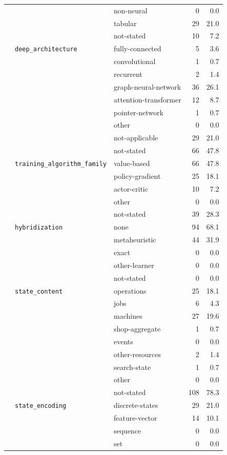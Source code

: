 \begin{longtable}{lllr@{\hspace{1.0em}}r}
 &  & non-neural & 0 & 0.0 \\
 &  & tabular & 29 & 21.0 \\
 &  & not-stated & 10 & 7.2 \\
 & \texttt{deep\_architecture} & fully-connected & 5 & 3.6 \\
 &  & convolutional & 1 & 0.7 \\
 &  & recurrent & 2 & 1.4 \\
 &  & graph-neural-network & 36 & 26.1 \\
 &  & attention-transformer & 12 & 8.7 \\
 &  & pointer-network & 1 & 0.7 \\
 &  & other & 0 & 0.0 \\
 &  & not-applicable & 29 & 21.0 \\
 &  & not-stated & 66 & 47.8 \\
 & \texttt{training\_algorithm\_family} & value-based & 66 & 47.8 \\
 &  & policy-gradient & 25 & 18.1 \\
 &  & actor-critic & 10 & 7.2 \\
 &  & other & 0 & 0.0 \\
 &  & not-stated & 39 & 28.3 \\
 & \texttt{hybridization} & none & 94 & 68.1 \\
 &  & metaheuristic & 44 & 31.9 \\
 &  & exact & 0 & 0.0 \\
 &  & other-learner & 0 & 0.0 \\
 &  & not-stated & 0 & 0.0 \\
 & \texttt{state\_content} & operations & 25 & 18.1 \\
 &  & jobs & 6 & 4.3 \\
 &  & machines & 27 & 19.6 \\
 &  & shop-aggregate & 1 & 0.7 \\
 &  & events & 0 & 0.0 \\
 &  & other-resources & 2 & 1.4 \\
 &  & search-state & 1 & 0.7 \\
 &  & other & 0 & 0.0 \\
 &  & not-stated & 108 & 78.3 \\
 & \texttt{state\_encoding} & discrete-states & 29 & 21.0 \\
 &  & feature-vector & 14 & 10.1 \\
 &  & sequence & 0 & 0.0 \\
 &  & set & 0 & 0.0 \\

\end{longtable}
